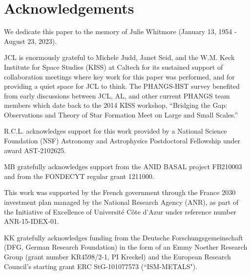 \documentclass[linenumbers]{aastex63}
\begin{document}




\section*{Acknowledgements}
We dedicate this paper to the memory of Julie Whitmore (January 13, 1954 - August 23, 2023).

JCL is enormously grateful to Michele Judd, Janet Seid, and the W.M. Keck Institute for Space Studies (KISS) at Caltech for its sustained support of collaboration meetings where key work for this paper was performed, and for providing a quiet space for JCL to think.  The PHANGS-HST survey benefited from early discussions between JCL, AL, and other current PHANGS team members which date back to the 2014 KISS workshop, ``Bridging the Gap: Observations and Theory of Star Formation Meet on Large and Small Scales.''

R.C.L. acknowledges support for this work provided by a National Science Foundation (NSF) Astronomy and Astrophysics Postdoctoral Fellowship under award AST-2102625.

MB gratefully acknowledges support from the ANID BASAL project FB210003 and from the FONDECYT regular grant 1211000.

This work was supported by the French government through the France 2030 investment plan managed by the National Research Agency (ANR), as part of the Initiative of Excellence of Université Côte d’Azur under reference number ANR-15-IDEX-01.

KK gratefully acknowledges funding from the Deutsche Forschungsgemeinschaft (DFG, German Research Foundation) in the form of an Emmy Noether Research Group (grant number KR4598/2-1, PI Kreckel) and the European Research Council’s starting grant ERC StG-101077573 (“ISM-METALS"). 
\end{document}
